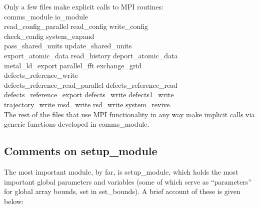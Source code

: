 Only a few files make explicit calls to MPI routines: \\
{\sc
comms\_module io\_module \\
read\_config\_parallel read\_config write\_config \\
check\_config system\_expand \\
pass\_shared\_units update\_shared\_units \\
export\_atomic\_data read\_history deport\_atomic\_data \\
metal\_ld\_export parallel\_fft exchange\_grid \\
defects\_reference\_write \\
defects\_reference\_read\_parallel defects\_reference\_read \\
defects\_reference\_export defects\_write defects1\_write \\
trajectory\_write msd\_write rsd\_write system\_revive}. \\
The rest of the files that use MPI functionality in any way make
implicit calls via generic functions developed in {\sc comms\_module}.

\subsection{Comments on {\sc setup\_module}}
\label{parameters}

The most important module, by far, is {\sc setup\_module}, which
holds the most important global parameters and variables (some of
which serve as ``parameters'' for global array bounds, set in {\sc
set\_bounds}). A brief account of these is given below:


